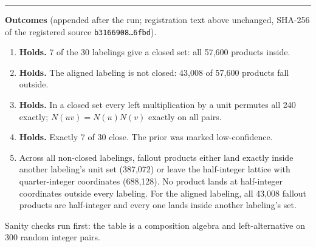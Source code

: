 \documentclass[11pt,a4paper]{article}
\begin{document}
\hrule\vspace{0.4em}
\textbf{Outcomes} (appended after the run; registration text above unchanged, SHA-256 of the registered source \texttt{b3166908\ldots6fbd}).
\begin{enumerate}
\item[H1] \textbf{Holds.} 7 of the 30 labelings give a closed set: all 57{,}600 products inside.
\item[H2] \textbf{Holds.} The aligned labeling is not closed: 43{,}008 of 57{,}600 products fall outside.
\item[H3] \textbf{Holds.} In a closed set every left multiplication by a unit permutes all 240 exactly; $N(uv)=N(u)N(v)$ exactly on all pairs.
\item[H4] \textbf{Holds.} Exactly 7 of 30 close. The prior was marked low-confidence.
\item[E1] Across all non-closed labelings, fallout products either land exactly inside another labeling's unit set (387{,}072) or leave the half-integer lattice with quarter-integer coordinates (688{,}128). No product lands at half-integer coordinates outside every labeling. For the aligned labeling, all 43{,}008 fallout products are half-integer and every one lands inside another labeling's set.
\end{enumerate}
Sanity checks run first: the table is a composition algebra and left-alternative on 300 random integer pairs.
\end{document}
